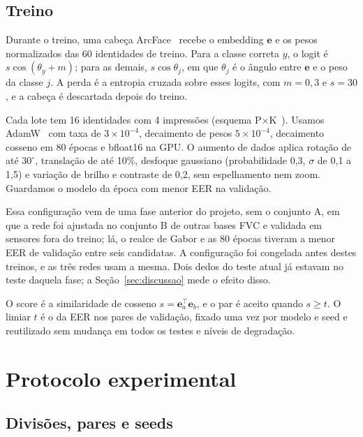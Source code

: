 \documentclass[conference]{IEEEtran}
\begin{document}
\subsection{Treino}

Durante o treino, uma cabeça ArcFace~\cite{deng2019arcface} recebe o embedding $\mathbf{e}$ e os pesos normalizados das 60 identidades de treino. Para a classe correta $y$, o logit é $s\cos(\theta_y+m)$; para as demais, $s\cos\theta_j$, em que $\theta_j$ é o ângulo entre $\mathbf{e}$ e o peso da classe $j$. A perda é a entropia cruzada sobre esses logits, com $m=0{,}3$ e $s=30$, e a cabeça é descartada depois do treino.

Cada lote tem 16 identidades com 4 impressões (esquema P$\times$K~\cite{hermans2017triplet}). Usamos AdamW~\cite{loshchilov2019adamw} com taxa de $3\times10^{-4}$, decaimento de pesos $5\times10^{-4}$, decaimento cosseno em 80 épocas e bfloat16 na GPU. O aumento de dados aplica rotação de até $30^\circ$, translação de até 10\%, desfoque gaussiano (probabilidade 0,3, $\sigma$ de 0,1 a 1,5) e variação de brilho e contraste de 0,2, sem espelhamento nem zoom. Guardamos o modelo da época com menor EER na validação.

Essa configuração vem de uma fase anterior do projeto, sem o conjunto A, em que a rede foi ajustada no conjunto B de outras bases FVC e validada em sensores fora do treino; lá, o realce de Gabor e as 80 épocas tiveram a menor EER de validação entre seis candidatas. A configuração foi congelada antes destes treinos, e as três redes usam a mesma. Dois dedos do teste atual já estavam no teste daquela fase; a Seção~\ref{sec:discussao} mede o efeito disso.

O score é a similaridade de cosseno $s=\mathbf{e}_a^\top\mathbf{e}_b$, e o par é aceito quando $s\ge t$. O limiar $t$ é o da EER nos pares de validação, fixado uma vez por modelo e seed e reutilizado sem mudança em todos os testes e níveis de degradação.

\section{Protocolo experimental}
\label{sec:protocolo}

\subsection{Divisões, pares e seeds}
\end{document}

